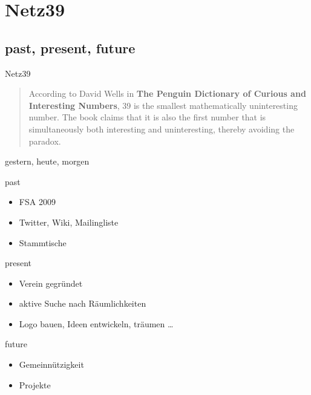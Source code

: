 \documentclass[hyperref={pdfpagelabels=false}]{beamer}
\begin{document}
\section{Netz39}

\subsection{past, present, future}

\begin{frame}{Netz39}
    \begin{quote}
        According to David Wells in \textbf{The Penguin Dictionary of Curious and
        Interesting Numbers}, 39 is the smallest mathematically uninteresting
        number. The book claims that it is also the first number that is
        simultaneously both interesting and uninteresting, thereby avoiding the
        paradox. \cite{Wikipedia2010}
    \end{quote}
\end{frame}

\begin{frame}{gestern, heute, morgen}
    \begin{block}{past}
        \begin{itemize}
            \item FSA 2009
            \item Twitter, Wiki, Mailingliste
            \item Stammtische
        \end{itemize}
    \end{block}
    \pause
    \begin{block}{present}
        \begin{itemize}
            \item Verein gegründet
            \item aktive Suche nach Räumlichkeiten
            \item Logo bauen, Ideen entwickeln, träumen \dots
        \end{itemize}
    \end{block}
    \pause
    \begin{block}{future}
        \begin{itemize}
            \item Gemeinnützigkeit
            \item Projekte
        \end{itemize}
    \end{block}
\end{frame}
\end{document}

